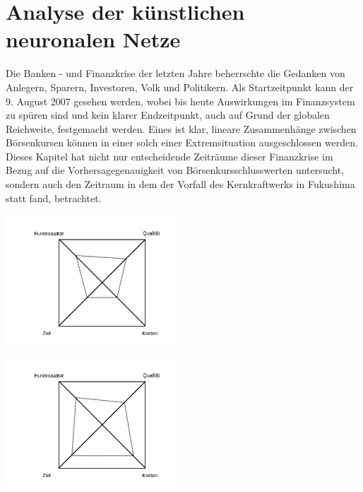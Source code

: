 \chapter{Analyse der künstlichen neuronalen Netze}

Die Banken - und Finanzkrise der letzten Jahre beherrschte die Gedanken von Anlegern, Sparern, Investoren, Volk und Politikern. Als Startzeitpunkt kann der 9. August 2007 gesehen werden, wobei bis heute Auswirkungen im Finanzsystem zu spüren sind und kein klarer Endzeitpunkt, auch auf Grund der globalen Reichweite, festgemacht werden. Eines ist klar, lineare Zusammenhänge zwischen Börsenkursen können in einer solch einer Extremsituation ausgeschlossen werden. Dieses Kapitel hat nicht nur entscheidende Zeiträume dieser Finanzkrise im Bezug auf die Vorhersagegenauigkeit von Börsenkursschlusswerten untersucht, sondern auch den Zeitraum in dem der Vorfall des Kernkraftwerks in Fukushima statt fand, betrachtet.

\begin{minipage}[c]{0.5\textwidth}

\includegraphics[width=0.49\textwidth]{Bilder/Konzeption/mag_viereck_not_linear.png}

\end{minipage}
\begin{minipage}[c]{0.5\textwidth}
\includegraphics[width=0.49\textwidth]{Bilder/Konzeption/mag_viereck_linear.png}
\end{minipage}  
